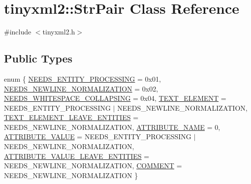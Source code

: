 \hypertarget{classtinyxml2_1_1_str_pair}{}\section{tinyxml2\+:\+:Str\+Pair Class Reference}
\label{classtinyxml2_1_1_str_pair}


{\ttfamily \#include $<$tinyxml2.\+h$>$}

\subsection*{Public Types}
\begin{DoxyCompactItemize}
\item 
enum \{ \newline
\hyperlink{classtinyxml2_1_1_str_pair_a0301ef962e15dd94574431f1c61266c5a4f1e01a55f8efe4ca72c32d454060237}{N\+E\+E\+D\+S\+\_\+\+E\+N\+T\+I\+T\+Y\+\_\+\+P\+R\+O\+C\+E\+S\+S\+I\+NG} = 0x01, 
\hyperlink{classtinyxml2_1_1_str_pair_a0301ef962e15dd94574431f1c61266c5a8f2045d56e70745d718672c0da91d0e0}{N\+E\+E\+D\+S\+\_\+\+N\+E\+W\+L\+I\+N\+E\+\_\+\+N\+O\+R\+M\+A\+L\+I\+Z\+A\+T\+I\+ON} = 0x02, 
\hyperlink{classtinyxml2_1_1_str_pair_a0301ef962e15dd94574431f1c61266c5a13996e9d4ed18fd2d6af59bbab291b63}{N\+E\+E\+D\+S\+\_\+\+W\+H\+I\+T\+E\+S\+P\+A\+C\+E\+\_\+\+C\+O\+L\+L\+A\+P\+S\+I\+NG} = 0x04, 
\hyperlink{classtinyxml2_1_1_str_pair_a0301ef962e15dd94574431f1c61266c5aae519eb5a639858591763aa5fc6cc953}{T\+E\+X\+T\+\_\+\+E\+L\+E\+M\+E\+NT} = N\+E\+E\+D\+S\+\_\+\+E\+N\+T\+I\+T\+Y\+\_\+\+P\+R\+O\+C\+E\+S\+S\+I\+NG $\vert$ N\+E\+E\+D\+S\+\_\+\+N\+E\+W\+L\+I\+N\+E\+\_\+\+N\+O\+R\+M\+A\+L\+I\+Z\+A\+T\+I\+ON, 
\newline
\hyperlink{classtinyxml2_1_1_str_pair_a0301ef962e15dd94574431f1c61266c5a96be48cf899bfeea0aa227f984f1fa63}{T\+E\+X\+T\+\_\+\+E\+L\+E\+M\+E\+N\+T\+\_\+\+L\+E\+A\+V\+E\+\_\+\+E\+N\+T\+I\+T\+I\+ES} = N\+E\+E\+D\+S\+\_\+\+N\+E\+W\+L\+I\+N\+E\+\_\+\+N\+O\+R\+M\+A\+L\+I\+Z\+A\+T\+I\+ON, 
\hyperlink{classtinyxml2_1_1_str_pair_a0301ef962e15dd94574431f1c61266c5aaab1cbefaa977e6f772b4e2575417aeb}{A\+T\+T\+R\+I\+B\+U\+T\+E\+\_\+\+N\+A\+ME} = 0, 
\hyperlink{classtinyxml2_1_1_str_pair_a0301ef962e15dd94574431f1c61266c5a6d72f9ce15f50e8bcd680edf66235dfd}{A\+T\+T\+R\+I\+B\+U\+T\+E\+\_\+\+V\+A\+L\+UE} = N\+E\+E\+D\+S\+\_\+\+E\+N\+T\+I\+T\+Y\+\_\+\+P\+R\+O\+C\+E\+S\+S\+I\+NG $\vert$ N\+E\+E\+D\+S\+\_\+\+N\+E\+W\+L\+I\+N\+E\+\_\+\+N\+O\+R\+M\+A\+L\+I\+Z\+A\+T\+I\+ON, 
\hyperlink{classtinyxml2_1_1_str_pair_a0301ef962e15dd94574431f1c61266c5a2decbd2513ac14f8befa987938326399}{A\+T\+T\+R\+I\+B\+U\+T\+E\+\_\+\+V\+A\+L\+U\+E\+\_\+\+L\+E\+A\+V\+E\+\_\+\+E\+N\+T\+I\+T\+I\+ES} = N\+E\+E\+D\+S\+\_\+\+N\+E\+W\+L\+I\+N\+E\+\_\+\+N\+O\+R\+M\+A\+L\+I\+Z\+A\+T\+I\+ON, 
\newline
\hyperlink{classtinyxml2_1_1_str_pair_a0301ef962e15dd94574431f1c61266c5a067a6ec90c8beea1cf5992930d93bffa}{C\+O\+M\+M\+E\+NT} = N\+E\+E\+D\+S\+\_\+\+N\+E\+W\+L\+I\+N\+E\+\_\+\+N\+O\+R\+M\+A\+L\+I\+Z\+A\+T\+I\+ON
 \}
\end{DoxyCompactItemize}
